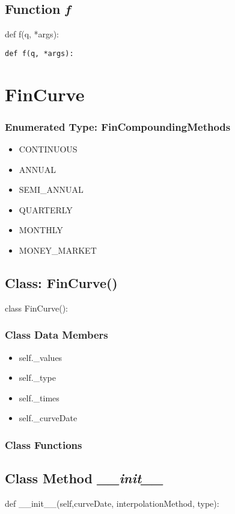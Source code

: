 \documentclass[twoside,11pt]{book}
\begin{document}
\subsection{Function {\it f}}
def f(q, *args):

\begin{lstlisting}
def f(q, *args):
\end{lstlisting}

\newpage
\section{FinCurve}

\subsubsection{Enumerated Type: FinCompoundingMethods}
\begin{itemize}
\item{CONTINUOUS}
\item{ANNUAL}
\item{SEMI\_ANNUAL}
\item{QUARTERLY}
\item{MONTHLY}
\item{MONEY\_MARKET}
\end{itemize}

\subsection{Class: FinCurve()}
class FinCurve():

\subsubsection{Class Data Members}
\begin{itemize}
\item{self.\_values}
\item{self.\_type}
\item{self.\_times}
\item{self.\_curveDate}
\end{itemize}

\subsubsection{Class Functions}

\subsection{Class Method {\it \_\_init\_\_}}
def \_\_init\_\_(self,curveDate, interpolationMethod, type):
\end{document}
